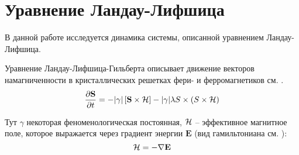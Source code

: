 \section{Уравнение Ландау-Лифшица}
В данной работе исследуется динамика системы, описанной уравнением
Ландау-Лифшица.

Уравнение Ландау-Лифшица-Гильберта описывает движение векторов намагниченности в
кристаллических решетках фери- и ферромагнетиков см. \cite{1984}.
\begin{equation}\label{eq:lan-lif-full}
    \frac{\partial \mathbf{S}}{\partial t} = - |\gamma|\left[\mathbf{S}\times
    \mathcal{H}\right]-
    |\gamma|\lambda S \times \left( S \times \mathcal{H} \right)
\end{equation}

Тут $\gamma$ некоторая феноменологическая постоянная,
$\mathcal{H}$ -- эффективное магнитное поле, которое выражается через градиент
энергии $\mathbf E$ (вид гамильтониана см. \cite[стр. 2]{Hagemeister2015}):
\begin{equation}
    \mathcal{H} = -\nabla \mathbf E \label{eq:heff-def}
\end{equation}

